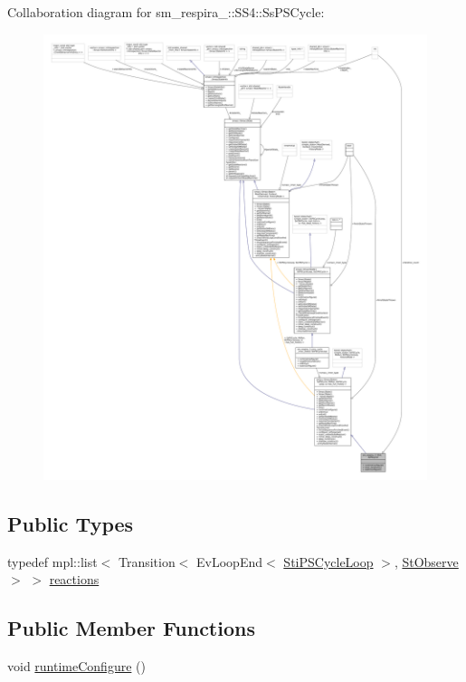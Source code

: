 Collaboration diagram for sm\+\_\+respira\+\_\+:\+:S\+S4\+:\+:Ss\+P\+S\+Cycle\+:
\nopagebreak
\begin{figure}[H]
\begin{center}
\leavevmode
\includegraphics[width=350pt]{structsm__respira__1_1_1SS4_1_1SsPSCycle__coll__graph}
\end{center}
\end{figure}
\subsection*{Public Types}
\begin{DoxyCompactItemize}
\item 
typedef mpl\+::list$<$ Transition$<$ Ev\+Loop\+End$<$ \hyperlink{structsm__respira__1_1_1cmv__cycle__inner__states_1_1StiPSCycleLoop}{Sti\+P\+S\+Cycle\+Loop} $>$, \hyperlink{structsm__respira__1_1_1StObserve}{St\+Observe} $>$ $>$ \hyperlink{structsm__respira__1_1_1SS4_1_1SsPSCycle_aad6397ffff7eef88efc3824b91423462}{reactions}
\end{DoxyCompactItemize}
\subsection*{Public Member Functions}
\begin{DoxyCompactItemize}
\item 
void \hyperlink{structsm__respira__1_1_1SS4_1_1SsPSCycle_a0604517fbc101096b2ff8b20ed9b4f80}{runtime\+Configure} ()
\end{DoxyCompactItemize}
